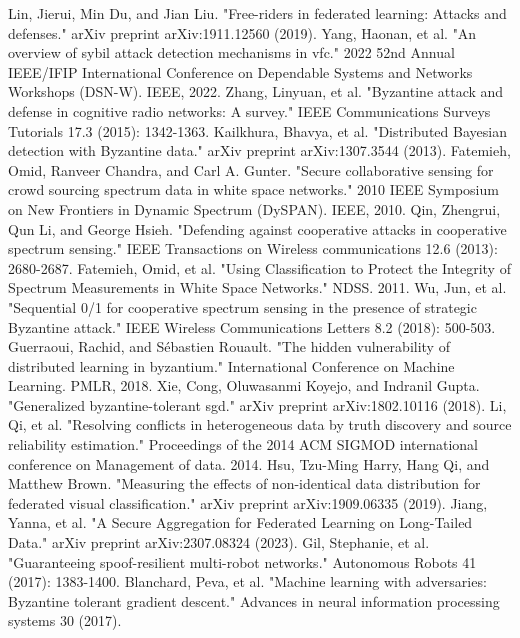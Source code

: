 \documentclass[conference]{IEEEtran}
\begin{document}
\begin{thebibliography}{00}
     Lin, Jierui, Min Du, and Jian Liu. "Free-riders in federated learning: Attacks and defenses." arXiv preprint arXiv:1911.12560 (2019).
     Yang, Haonan, et al. "An overview of sybil attack detection mechanisms in vfc." 2022 52nd Annual IEEE/IFIP International Conference on Dependable Systems and Networks Workshops (DSN-W). IEEE, 2022.
     Zhang, Linyuan, et al. "Byzantine attack and defense in cognitive radio networks: A survey." IEEE Communications Surveys  Tutorials 17.3 (2015): 1342-1363.
     Kailkhura, Bhavya, et al. "Distributed Bayesian detection with Byzantine data." arXiv preprint arXiv:1307.3544 (2013).
     Fatemieh, Omid, Ranveer Chandra, and Carl A. Gunter. "Secure collaborative sensing for crowd sourcing spectrum data in white space networks." 2010 IEEE Symposium on New Frontiers in Dynamic Spectrum (DySPAN). IEEE, 2010.
     Qin, Zhengrui, Qun Li, and George Hsieh. "Defending against cooperative attacks in cooperative spectrum sensing." IEEE Transactions on Wireless communications 12.6 (2013): 2680-2687.
     Fatemieh, Omid, et al. "Using Classification to Protect the Integrity of Spectrum Measurements in White Space Networks." NDSS. 2011.
     Wu, Jun, et al. "Sequential 0/1 for cooperative spectrum sensing in the presence of strategic Byzantine attack." IEEE Wireless Communications Letters 8.2 (2018): 500-503.
     Guerraoui, Rachid, and Sébastien Rouault. "The hidden vulnerability of distributed learning in byzantium." International Conference on Machine Learning. PMLR, 2018.
     Xie, Cong, Oluwasanmi Koyejo, and Indranil Gupta. "Generalized byzantine-tolerant sgd." arXiv preprint arXiv:1802.10116 (2018).
     Li, Qi, et al. "Resolving conflicts in heterogeneous data by truth discovery and source reliability estimation." Proceedings of the 2014 ACM SIGMOD international conference on Management of data. 2014.
     Hsu, Tzu-Ming Harry, Hang Qi, and Matthew Brown. "Measuring the effects of non-identical data distribution for federated visual classification." arXiv preprint arXiv:1909.06335 (2019).
     Jiang, Yanna, et al. "A Secure Aggregation for Federated Learning on Long-Tailed Data." arXiv preprint arXiv:2307.08324 (2023).
     Gil, Stephanie, et al. "Guaranteeing spoof-resilient multi-robot networks." Autonomous Robots 41 (2017): 1383-1400.
     Blanchard, Peva, et al. "Machine learning with adversaries: Byzantine tolerant gradient descent." Advances in neural information processing systems 30 (2017).

\end{thebibliography}
\end{document}
